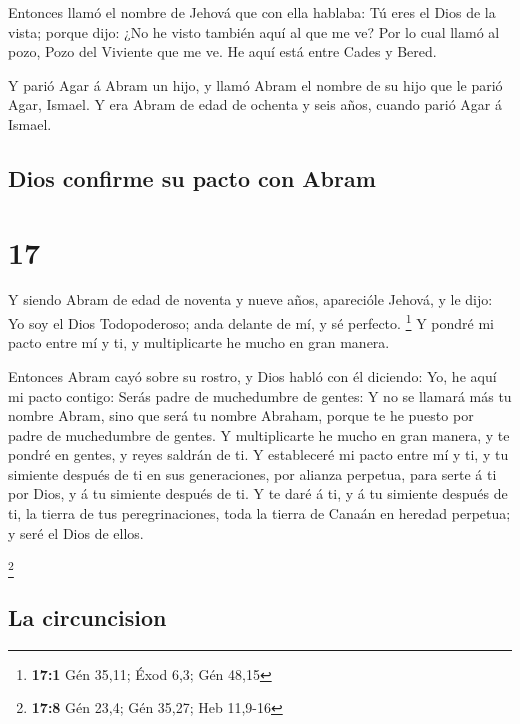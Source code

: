  Entonces llamó el nombre de Jehová que con ella hablaba:
Tú eres el Dios de la vista; porque dijo: ¿No he visto también aquí al
que me ve?  Por lo cual llamó al pozo, Pozo del Viviente
que me ve. He aquí está entre Cades y Bered.

 Y parió Agar á Abram un hijo, y llamó Abram el nombre de
su hijo que le parió Agar, Ismael.  Y era Abram de edad de
ochenta y seis años, cuando parió Agar á Ismael.

\hypertarget{dios-confirme-su-pacto-con-abram}{%
\subsection{Dios confirme su pacto con
Abram}\label{dios-confirme-su-pacto-con-abram}}

\hypertarget{section-16}{%
\section{17}\label{section-16}}

 Y siendo Abram de edad de noventa y nueve años, aparecióle
Jehová, y le dijo: Yo soy el Dios Todopoderoso; anda delante de mí, y sé
perfecto. \footnote{\textbf{17:1} Gén 35,11; Éxod 6,3; Gén 48,15}
 Y pondré mi pacto entre mí y ti, y multiplicarte he mucho
en gran manera.

 Entonces Abram cayó sobre su rostro, y Dios habló con él
diciendo:  Yo, he aquí mi pacto contigo: Serás padre de
muchedumbre de gentes:  Y no se llamará más tu nombre Abram,
sino que será tu nombre Abraham, porque te he puesto por padre de
muchedumbre de gentes.  Y multiplicarte he mucho en gran
manera, y te pondré en gentes, y reyes saldrán de ti.  Y
estableceré mi pacto entre mí y ti, y tu simiente después de ti en sus
generaciones, por alianza perpetua, para serte á ti por Dios, y á tu
simiente después de ti.  Y te daré á ti, y á tu simiente
después de ti, la tierra de tus peregrinaciones, toda la tierra de
Canaán en heredad perpetua; y seré el Dios de ellos.

\footnote{\textbf{17:8} Gén 23,4; Gén 35,27; Heb 11,9-16}

\hypertarget{la-circuncision}{%
\subsection{La circuncision}\label{la-circuncision}}

